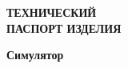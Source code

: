 \vspace*{\fill}

\noindent
{\Huge\textbf{\textcolor{clColontitulText}{
ТЕХНИЧЕСКИЙ\\ 
ПАСПОРТ ИЗДЕЛИЯ
}}\par}

\vspace*{\fill}
\vspace*{\fill}

\begin{flushleft}
    
    \noindent   
    
    {\Large\textbf{\textcolor{clColontitulText}{
        Симулятор~\producttype        
    }}\par}

    \vspace*{\fill}

    \noindent   
    
    {\Large\textbf{\textcolor{clColontitulText}{
        \productname        
    }}\par}
             
\end{flushleft}
     
\vspace*{\fill}
\begin{flushright}
    \producttrademarknametitul
\end{flushright}
\vspace*{\fill}






